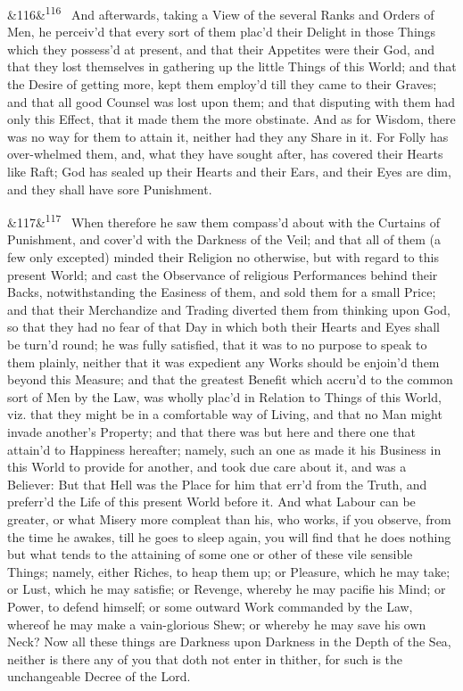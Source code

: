 \documentclass[12pt]{article}
\newcommand{\para}[1][]{\par\noindent\ifx&#1&\else\textsuperscript{\footnotesize #1}~\fi}
\begin{document}
\para[116] And afterwards, taking a View of the several Ranks and Orders of Men, he perceiv'd that every sort of them plac'd their Delight in those Things which they possess'd at present, and that their Appetites were their God, and that they lost themselves in gathering up the little Things of this World; and that the Desire of getting more, kept them employ'd till they came to their Graves; and that all good Counsel was lost upon them; and that disputing with them had only this Effect, that it made them the more obstinate. And as for Wisdom, there was no way for them to attain it, neither had they any Share in it. For Folly has over-whelmed them, and, what they have sought after, has covered their Hearts like Raft; God has sealed up their Hearts and their Ears, and their Eyes are dim, and they shall have sore Punishment.

\para[117] When therefore he saw them compass'd about with the Curtains of Punishment, and cover'd with the Darkness of the Veil; and that all of them (a few only excepted) minded their Religion no otherwise, but with regard to this present World; and cast the Observance of religious Performances behind their Backs, notwithstanding the Easiness of them, and sold them for a small Price; and that their Merchandize and Trading diverted them from thinking upon God, so that they had no fear of that Day in which both their Hearts and Eyes shall be turn'd round; he was fully satisfied, that it was to no purpose to speak to them plainly, neither that it was expedient any Works should be enjoin'd them beyond this Measure; and that the greatest Benefit which accru'd to the common sort of Men by the Law, was wholly plac'd in Relation to Things of this World, viz. that they might be in a comfortable way of Living, and that no Man might invade another's Property; and that there was but here and there one that attain'd to Happiness hereafter; namely, such an one as made it his Business in this World to provide for another, and took due care about it, and was a Believer: But that Hell was the Place for him that err'd from the Truth, and preferr'd the Life of this present World before it. And what Labour can be greater, or what Misery more compleat than his, who works, if you observe, from the time he awakes, till he goes to sleep again, you will find that he does nothing but what tends to the attaining of some one or other of these vile sensible Things; namely, either Riches, to heap them up; or Pleasure, which he may take; or Lust, which he may satisfie; or Revenge, whereby he may pacifie his Mind; or Power, to defend himself; or some outward Work commanded by the Law, whereof he may make a vain-glorious Shew; or whereby he may save his own Neck? Now all these things are Darkness upon Darkness in the Depth of the Sea, neither is there any of you that doth not enter in thither, for such is the unchangeable Decree of the Lord.
\end{document}
